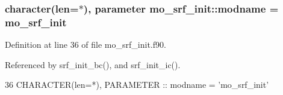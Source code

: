 \subsubsection[{modname}]{\setlength{\rightskip}{0pt plus 5cm}character(len=$\ast$), parameter mo\+\_\+srf\+\_\+init\+::modname = \textquotesingle{}mo\+\_\+srf\+\_\+init\textquotesingle{}}\label{namespacemo__srf__init_aa48301154b912ae072ff1916d431321b}


Definition at line 36 of file mo\+\_\+srf\+\_\+init.\+f90.



Referenced by srf\+\_\+init\+\_\+bc(), and srf\+\_\+init\+\_\+ic().


\begin{DoxyCode}
36   \textcolor{keywordtype}{CHARACTER(len=*)}, \textcolor{keywordtype}{PARAMETER} :: modname = \textcolor{stringliteral}{'mo\_srf\_init'}
\end{DoxyCode}
